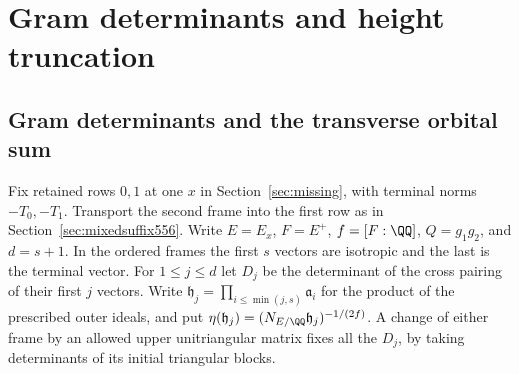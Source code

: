 \documentclass[a4paper,11pt]{article}
\theoremstyle{definition}
\theoremstyle{remark}
\numberwithin{equation}{section}
\begin{document}
\section{Gram determinants and height truncation}\label{nav:chapter-transverse-determinants}

\subsection{Gram determinants and the transverse orbital sum}
\label{sec:transversesum582}

Fix retained rows \(0,1\) at one \(x\) in
Section~\ref{sec:missing}, with terminal norms \(-T_0,-T_1\).
Transport the second frame into the first row as in
Section~\ref{sec:mixedsuffix556}. Write \(E=E_x\), \(F=E^+\),
\(f=[F:\QQ]\), \(Q=g_1g_2\), and \(d=s+1\). In the ordered
frames the first \(s\) vectors are isotropic and the last
is the terminal vector. For \(1\le j\le d\) let \(D_j\) be the
determinant of the cross pairing of their first \(j\) vectors.
Write \(\mathfrak h_j=\prod_{i\le\min(j,s)}\mathfrak a_i\)
for the product of the prescribed outer ideals, and put
\(\eta(\mathfrak h_j)=(N_{E/\QQ}\mathfrak h_j)^{-1/(2f)}\).
A change of either frame by an allowed upper unitriangular
matrix fixes all the \(D_j\), by taking determinants of its
initial triangular blocks.
\end{document}
